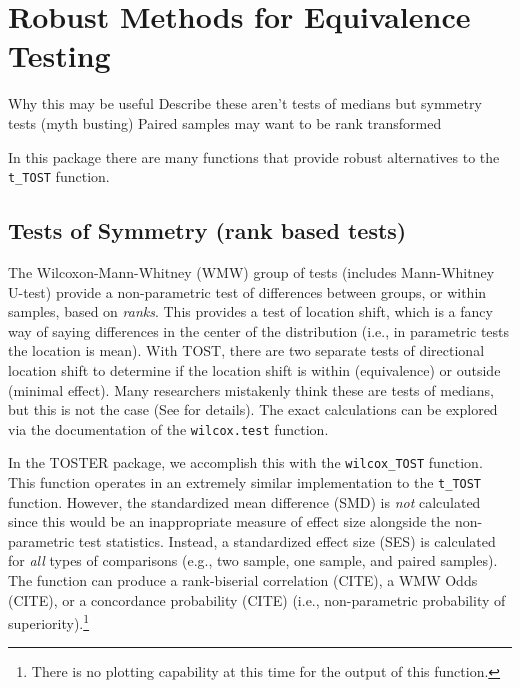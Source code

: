 \documentclass[]{interact}
\theoremstyle{plain}%
\theoremstyle{definition}
\theoremstyle{remark}
\begin{document}
\newpage

\hypertarget{robust-methods-for-equivalence-testing}{%
\section{Robust Methods for Equivalence
Testing}\label{robust-methods-for-equivalence-testing}}

Why this may be useful Describe these aren't tests of medians but
symmetry tests (myth busting) Paired samples may want to be rank
transformed

In this package there are many functions that provide robust
alternatives to the \texttt{t\_TOST} function.

\hypertarget{tests-of-symmetry-rank-based-tests}{%
\subsection{Tests of Symmetry (rank based
tests)}\label{tests-of-symmetry-rank-based-tests}}

The Wilcoxon-Mann-Whitney (WMW) group of tests (includes Mann-Whitney
U-test) provide a non-parametric test of differences between groups, or
within samples, based on \emph{ranks}. This provides a test of location
shift, which is a fancy way of saying differences in the center of the
distribution (i.e., in parametric tests the location is mean). With
TOST, there are two separate tests of directional location shift to
determine if the location shift is within (equivalence) or outside
(minimal effect). Many researchers mistakenly think these are tests of
medians, but this is not the case (See \citet{median_test} for details).
The exact calculations can be explored via the documentation of the
\texttt{wilcox.test} function.

In the TOSTER package, we accomplish this with the \texttt{wilcox\_TOST}
function. This function operates in an extremely similar implementation
to the \texttt{t\_TOST} function. However, the standardized mean
difference (SMD) is \emph{not} calculated since this would be an
inappropriate measure of effect size alongside the non-parametric test
statistics. Instead, a standardized effect size (SES) is calculated for
\emph{all} types of comparisons (e.g., two sample, one sample, and
paired samples). The function can produce a rank-biserial correlation
(CITE), a WMW Odds (CITE), or a concordance probability (CITE) (i.e.,
non-parametric probability of superiority).\footnote{There is no
  plotting capability at this time for the output of this function.}
\end{document}

